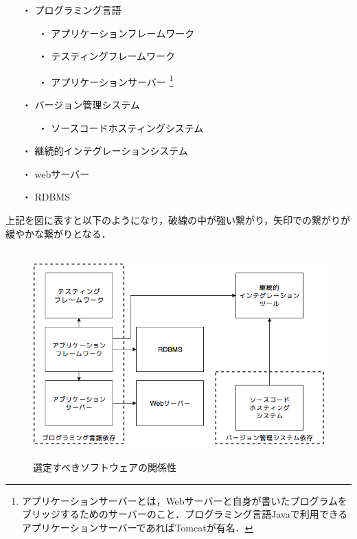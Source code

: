 \begin{itemize}
 \item[・]プログラミング言語
   \begin{itemize}
    \item[・]アプリケーションフレームワーク
    \item[・]テスティングフレームワーク
    \item[・]アプリケーションサーバー \footnote{
      アプリケーションサーバーとは，Webサーバーと自身が書いたプログラムをブリッジするためのサーバーのこと．プログラミング言語Javaで利用できるアプリケーションサーバーであればTomcatが有名．
    }
   \end{itemize}
 \item[・]バージョン管理システム
   \begin{itemize}
     \item[・]ソースコードホスティングシステム
   \end{itemize}
 \item[・]継続的インテグレーションシステム
 \item[・]webサーバー
 \item[・]RDBMS
\end{itemize}

上記を図に表すと以下のようになり，破線の中が強い繋がり，矢印での繋がりが緩やかな繋がりとなる．

\begin{figure}[H]
  \begin{center}
    \includegraphics[height=8cm]{./assets/images/tech_relation.png}
    \caption{選定すべきソフトウェアの関係性}
    \label{fig:tech_relation}
  \end{center}
\end{figure}

